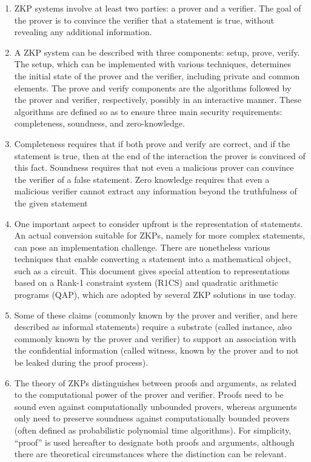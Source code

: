 \documentclass[11pt]{article}
\begin{document}
\begin{enumerate}
\item ZKP systems involve at least two parties: a prover and a verifier. The goal of the prover is to convince the verifier that a statement is true, without revealing any additional information.

\item A ZKP system can be described with three components: setup, prove, verify. The setup, which can be implemented with various techniques, determines the initial state of the prover and the verifier, including private and common elements. The prove and verify components are the algorithms followed by the prover and verifier, respectively, possibly in an interactive manner. These algorithms are defined so as to ensure three main security requirements: completeness, soundness, and zero-knowledge.

\item Completeness requires that if both prove and verify are correct, and if the statement is true, then at the end of the interaction the prover is convinced of this fact. Soundness requires that not even a malicious prover can convince the verifier of a false statement. Zero knowledge requires that even a malicious verifier cannot extract any information beyond the truthfulness of the given statement

\item One important aspect to consider upfront is the representation of statements. An actual conversion suitable for ZKPs, namely for more complex statements, can pose an implementation challenge. There are nonetheless various techniques that enable converting a statement into a mathematical object, such as a circuit. This document gives special attention to representations based on a Rank-1 constraint system (R1CS) and quadratic arithmetic programs (QAP), which are adopted by several ZKP solutions in use today.

\item Some of these claims (commonly known by the prover and verifier, and here described as informal statements) require a substrate (called instance, also commonly known by the prover and verifier) to support an association with the confidential information (called witness, known by the prover and to not be leaked during the proof process).

\item The theory of ZKPs distinguishes between proofs and arguments, as related to the computational power of the prover and verifier. Proofs need to be sound even against computationally unbounded provers, whereas arguments only need to preserve soundness against computationally bounded provers (often defined as probabilistic polynomial time algorithms). For simplicity, “proof” is used hereafter to designate both proofs and arguments, although there are theoretical circumstances where the distinction can be relevant.


\end{enumerate}
\end{document}
